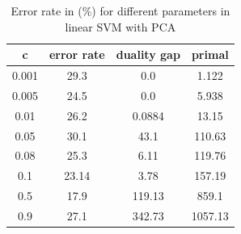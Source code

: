\documentclass[twoside,a4paper,12pt]{report}
\begin{document}
\begin{table}[H]
    \centering
     \begin{tabular}{||c c c c||} 
        \hline \hline
            	 c 	& error rate &	 duality gap &	 primal \\ 
                 \hline
            	0.001	&   29.3 &	 0.0 	& 1.122 \\
                \hline
            	0.005 &   24.5 	& 0.0 &	 5.938 \\
                \hline
            	0.01	&   26.2 	 &0.0884 	& 13.15 \\
                \hline
            	0.05	&   30.1 	& 43.1	& 110.63 \\
                \hline
            	0.08	&   25.3 &	 6.11 &	 119.76 \\
                \hline
            	0.1	    &   23.14 	& 3.78	& 157.19 \\
                \hline
            	0.5	&    \cellcolor{blue!25} 17.9	& \cellcolor{red!25} 119.13	& 859.1 \\
                \hline
             	0.9	&   27.1 	& 342.73 	& 1057.13 \\
        \hline \hline
    \end{tabular}
    \caption{Error rate in (\%) for different parameters in linear SVM with PCA \label{errorRatesLinearSVM}}
\end{table}    
\end{document}
